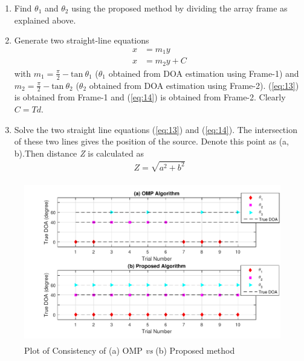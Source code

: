 \documentclass[12pt,a4paper]{article}
\theoremstyle{plain}
\theoremstyle{definition}
\begin{document}
\begin{enumerate}[Step 1:~]
\item Find $\theta_1$ and $\theta_2$ using the proposed method by dividing the array frame as explained above.
\item Generate two straight-line equations
\begin{align}
\textit{x} &= \textit{m}_1 \textit{y}\label{eq:13}\\
\textit{x} &= \textit{m}_2 \textit{y} + \textit{C}\label{eq:14}
\end{align}
with \( \textit{m}_1 = \frac{\pi}{2} - \text{tan}~\theta_1\) ($\theta_1$ obtained from DOA estimation using Frame-1) and \( \textit{m}_2 = \frac{\pi}{2} - \text{tan}~\theta_2\) ($\theta_2$ obtained from DOA estimation using Frame-2). (\ref{eq:13}) is obtained from Frame-1 and (\ref{eq:14}) is obtained from Frame-2. Clearly \(\textit{C} = \textit{T}d\).
\item Solve the two straight line equations (\ref{eq:13}) and (\ref{eq:14}). The intersection of these two lines gives the position of the source. Denote this point as (a, b).Then distance \textit{Z} is calculated as
\begin{align}
\textit{Z} = \sqrt{\textit{a}^2 + \textit{b}^2}
\end{align}
\end{enumerate}

\begin{figure}[H] 
    \centering
    \includegraphics[height=7cm]{figs/Plot_9-eps-converted-to.pdf}
    \caption{Plot of Consistency of (a) OMP \textit{vs} (b) Proposed method}
    \label{figc3}
\end{figure}
\end{document}
